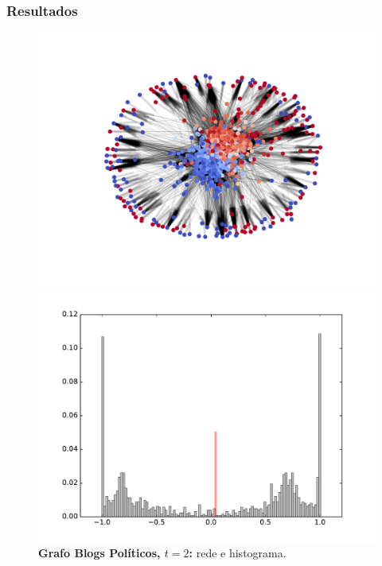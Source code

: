 \begin{frame}
  \frametitle{Resultados}

  \begin{figure}
  \centering
  \begin{minipage}{5.5cm}
    \includegraphics[width=\textwidth]{./figures/99N002}
  \end{minipage}
  \begin{minipage}{5.5cm}
    \includegraphics[width=\textwidth]{./figures/99H002}
  \end{minipage}
  \vspace{5mm}
  \caption*{\textbf{Grafo Blogs Políticos, $t = 2$:} rede e histograma.}
  \end{figure}
\end{frame}

